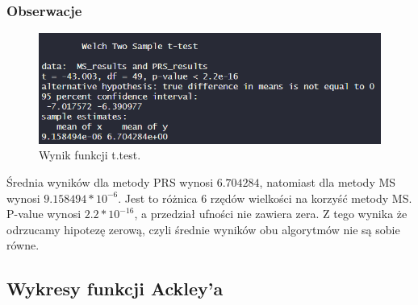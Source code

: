 \documentclass{lab}
\begin{document}
\subsubsection{Obserwacje}
 \begin{figure}[H]
     \centering
     \includegraphics[width=0.9\linewidth]{img/T3.png}
     \caption{Wynik funkcji t.test.}
     \label{fig:enter-label}
 \end{figure}
Średnia wyników dla metody PRS wynosi $6.704284$, natomiast dla metody MS wynosi $9.158494*10^{-6}$. Jest to różnica 6 rzędów wielkości na korzyść metody MS. P-value wynosi $2.2*10^{-16}$, a przedział ufności nie zawiera zera. Z tego wynika że odrzucamy hipotezę zerową, czyli średnie wyników obu algorytmów nie są sobie równe.

\subsection{Wykresy funkcji Ackley’a}
\end{document}
